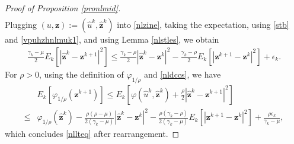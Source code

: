 \documentclass[10pt,reqno]{amsart}
\newcommand{\1}{{\chi}}
\def\leq{\leqslant}
\numberwithin{equation}{section}
\theoremstyle{thmlemcorr}
\numberwithin{theorem}{section}
\theoremstyle{thmlemcorr*}
\theoremstyle{defi}
\theoremstyle{remexample}
\theoremstyle{ass}
\begin{document}
\begin{proof}[Proof of Proposition \ref{pronlmid}]
\begin{align}
	\end{align}
	Plugging $(u, \boldsymbol{z}):=(\hat{u}^k, \hat{\boldsymbol{z}}^k)$ into \eqref{nlzine}, taking the expectation, using \eqref{stb} and \eqref{vpuhzhnlmuk1}, and using Lemma \ref{nlstles}, we obtain
	\begin{align}
		\label{nldccs}
		\frac{\gamma_k-\mu}{2} E_k[|\hat{\boldsymbol{z}}^k - \boldsymbol{z}^{k+1}|^2] \leq \frac{\gamma_k-\rho}{2}|\hat{\boldsymbol{z}}^k - \boldsymbol{z}^k|^2 - \frac{\gamma_k-\rho}{2}E_k[|\boldsymbol{z}^{k+1} - \boldsymbol{z}^k|^2] + \epsilon_k. 
	\end{align}
	For $\rho>0$, using the definition of $\varphi_{1/\rho}$ and \eqref{nldccs}, we have
	\begin{align}
		&E_k[\varphi_{1/\rho}(\boldsymbol{z}^{k+1})] 
		\leq  E_k[\varphi(\hat{u}^k, \hat{\boldsymbol{z}}^k) + \frac{\rho}{2}|\hat{\boldsymbol{z}}^k - \boldsymbol{z}^{k+1}|^2]\nonumber\\
		\leq & \varphi_{1/\rho}(\hat{\boldsymbol{z}}^k) - \frac{\rho(\rho-\mu)}{2(\gamma_k - \mu)}|\hat{\boldsymbol{z}}^k - \boldsymbol{z}^k|^2 - \frac{\rho(\gamma_k - \rho)}{2(\gamma_k - \mu)}E_k[|\boldsymbol{z}^{k+1} - \boldsymbol{z}^k|^2] + \frac{\rho\epsilon_k}{\gamma_k - \mu},\nonumber
	\end{align}
	which concludes \eqref{nllteq} after rearrangement. 
\end{proof}
\end{document}
